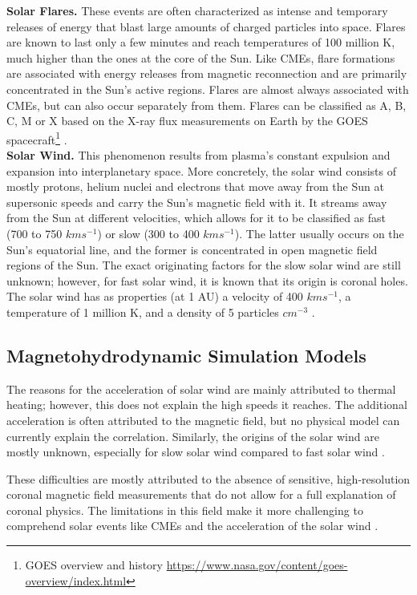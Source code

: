 \noindent\textbf{Solar Flares.} These events are often characterized as intense and temporary releases of energy that blast large amounts of charged particles into space. Flares are known to last only a few minutes and reach temperatures of 100 million K, much higher than the ones at the core of the Sun. Like CMEs, flare formations are associated with energy releases from magnetic reconnection and are primarily concentrated in the Sun's active regions. Flares are almost always associated with CMEs, but can also occur separately from them. Flares can be classified as A, B, C, M or X based on the X-ray flux measurements on Earth by the GOES spacecraft\footnote{GOES overview and history \url{https://www.nasa.gov/content/goes-overview/index.html}} \cite{moldwin_2008, priest_2014}.\\

\noindent\textbf{Solar Wind.} This phenomenon results from plasma's constant expulsion and expansion into interplanetary space. More concretely, the solar wind consists of mostly protons, helium nuclei and electrons that move away from the Sun at supersonic speeds and carry the Sun's magnetic field with it. It streams away from the Sun at different velocities, which allows for it to be classified as fast (700 to 750 $km s^{-1}$) or slow (300 to 400 $km s^{-1}$). The latter usually occurs on the Sun's equatorial line, and the former is concentrated in open magnetic field regions of the Sun. The exact originating factors for the slow solar wind are still unknown; however, for fast solar wind, it is known that its origin is coronal holes. The solar wind has as properties (at 1 AU) a velocity of 400 $km s^{-1}$, a temperature of 1 million K, and a density of 5 particles $cm^{-3}$ \cite{moldwin_2008, priest_2014}.

\subsection{Magnetohydrodynamic Simulation Models}\label{sec:back_mhd_sim}
The reasons for the acceleration of solar wind are mainly attributed to thermal heating; however, this does not explain the high speeds it reaches. The additional acceleration is often attributed to the magnetic field, but no physical model can currently explain the correlation. Similarly, the origins of the solar wind are mostly unknown, especially for slow solar wind compared to fast solar wind \cite{priest_2014}.

These difficulties are mostly attributed to the absence of sensitive, high-resolution coronal magnetic field measurements that do not allow for a full explanation of coronal physics. The limitations in this field make it more challenging to comprehend solar events like CMEs and the acceleration of the solar wind \cite{solanki.etal_SolarMagneticField_2006}.

